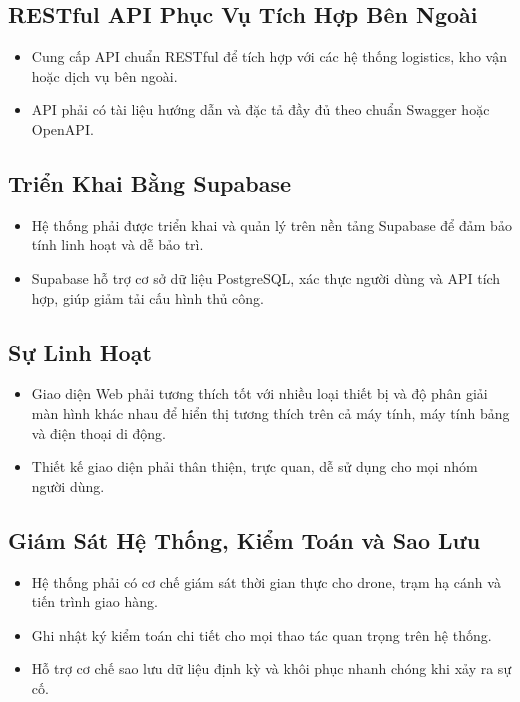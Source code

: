 \subsection{RESTful API Phục Vụ Tích Hợp Bên Ngoài}
\begin{itemize}
  \item Cung cấp API chuẩn RESTful để tích hợp với các hệ thống logistics, kho vận hoặc dịch vụ bên ngoài.
  \item API phải có tài liệu hướng dẫn và đặc tả đầy đủ theo chuẩn Swagger hoặc OpenAPI.
\end{itemize}

\subsection{Triển Khai Bằng Supabase}
\begin{itemize}
  \item Hệ thống phải được triển khai và quản lý trên nền tảng Supabase để đảm bảo tính linh hoạt và dễ bảo trì.
  \item Supabase hỗ trợ cơ sở dữ liệu PostgreSQL, xác thực người dùng và API tích hợp, giúp giảm tải cấu hình thủ công.
\end{itemize}

\subsection{Sự Linh Hoạt}
\begin{itemize}
  \item Giao diện Web phải tương thích tốt với nhiều loại thiết bị và độ phân giải màn hình khác nhau để hiển thị tương thích trên cả máy tính, máy tính bảng và điện thoại di động.
  \item Thiết kế giao diện phải thân thiện, trực quan, dễ sử dụng cho mọi nhóm người dùng.
\end{itemize}

\subsection{Giám Sát Hệ Thống, Kiểm Toán và Sao Lưu}
\begin{itemize}
  \item Hệ thống phải có cơ chế giám sát thời gian thực cho drone, trạm hạ cánh và tiến trình giao hàng.
  \item Ghi nhật ký kiểm toán chi tiết cho mọi thao tác quan trọng trên hệ thống.
  \item Hỗ trợ cơ chế sao lưu dữ liệu định kỳ và khôi phục nhanh chóng khi xảy ra sự cố.
\end{itemize}

